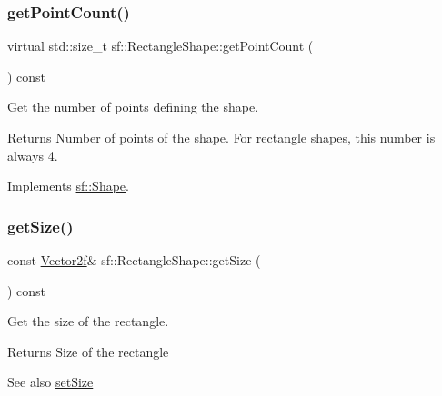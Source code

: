 \subsubsection{\texorpdfstring{get\+Point\+Count()}{getPointCount()}}
{\footnotesize\ttfamily virtual std\+::size\+\_\+t sf\+::\+Rectangle\+Shape\+::get\+Point\+Count (\begin{DoxyParamCaption}{ }\end{DoxyParamCaption}) const\hspace{0.3cm}{\ttfamily [virtual]}}



Get the number of points defining the shape. 

\begin{DoxyReturn}{Returns}
Number of points of the shape. For rectangle shapes, this number is always 4. 
\end{DoxyReturn}


Implements \hyperlink{classsf_1_1_shape_af988dd61a29803fc04d02198e44b5643}{sf\+::\+Shape}.

\mbox{\label{classsf_1_1_rectangle_shape_ae54a07ff5537bf76de6748f592b34896}} 
\subsubsection{\texorpdfstring{get\+Size()}{getSize()}}
{\footnotesize\ttfamily const \hyperlink{classsf_1_1_vector2}{Vector2f}\& sf\+::\+Rectangle\+Shape\+::get\+Size (\begin{DoxyParamCaption}{ }\end{DoxyParamCaption}) const}



Get the size of the rectangle. 

\begin{DoxyReturn}{Returns}
Size of the rectangle
\end{DoxyReturn}
\begin{DoxySeeAlso}{See also}
\hyperlink{classsf_1_1_rectangle_shape_a5c65d374d4a259dfdc24efdd24a5dbec}{set\+Size} 
\end{DoxySeeAlso}
\mbox{\label{classsf_1_1_rectangle_shape_a5c65d374d4a259dfdc24efdd24a5dbec}} 
